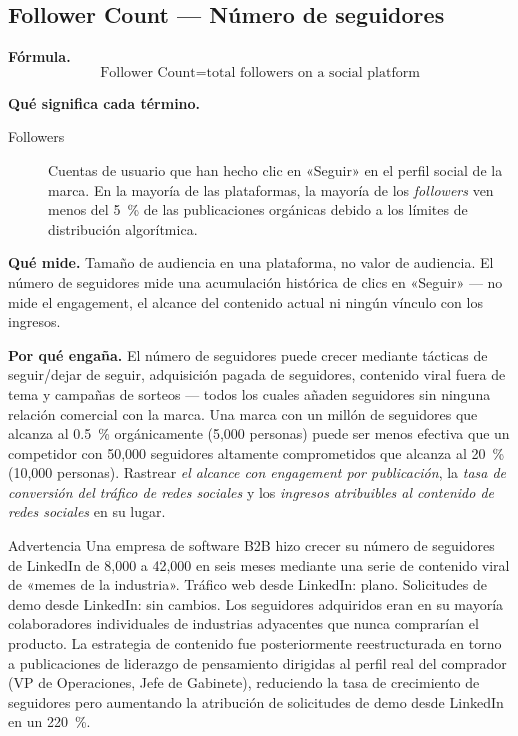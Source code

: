 \subsection{Follower Count --- Número de seguidores}

\textbf{Fórmula.}
\[
  \text{Follower Count} = \text{total followers on a social platform}
\]

\textbf{Qué significa cada término.}
\begin{description}
  \item[Followers] Cuentas de usuario que han hecho clic en «Seguir» en el perfil social de
    la marca. En la mayoría de las plataformas, la mayoría de los \emph{followers} ven menos
    del \qty{5}{\percent} de las publicaciones orgánicas debido a los límites de distribución
    algorítmica.
\end{description}

\textbf{Qué mide.} Tamaño de audiencia en una plataforma, no valor de audiencia. El número
de seguidores mide una acumulación histórica de clics en «Seguir» --- no mide el engagement,
el alcance del contenido actual ni ningún vínculo con los ingresos.

\textbf{Por qué engaña.} El número de seguidores puede crecer mediante tácticas de
seguir/dejar de seguir, adquisición pagada de seguidores, contenido viral fuera de tema y
campañas de sorteos --- todos los cuales añaden seguidores sin ninguna relación comercial
con la marca. Una marca con un millón de seguidores que alcanza al \qty{0.5}{\percent}
orgánicamente (5,000 personas) puede ser menos efectiva que un competidor con 50,000
seguidores altamente comprometidos que alcanza al \qty{20}{\percent} (10,000 personas).
Rastrear \emph{el alcance con engagement por publicación}, la \emph{tasa de conversión del
tráfico de redes sociales} y los \emph{ingresos atribuibles al contenido de redes sociales}
en su lugar.

\begin{admonition}{Advertencia}
Una empresa de software B2B hizo crecer su número de seguidores de LinkedIn de 8,000 a
42,000 en seis meses mediante una serie de contenido viral de «memes de la industria».
Tráfico web desde LinkedIn: plano. Solicitudes de demo desde LinkedIn: sin cambios. Los
seguidores adquiridos eran en su mayoría colaboradores individuales de industrias adyacentes
que nunca comprarían el producto. La estrategia de contenido fue posteriormente reestructurada
en torno a publicaciones de liderazgo de pensamiento dirigidas al perfil real del comprador
(VP de Operaciones, Jefe de Gabinete), reduciendo la tasa de crecimiento de seguidores pero
aumentando la atribución de solicitudes de demo desde LinkedIn en un \qty{220}{\percent}.
\end{admonition}


